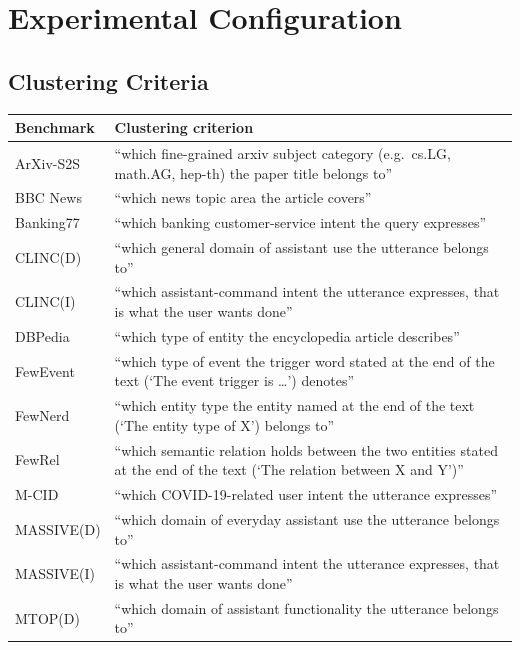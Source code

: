 \documentclass[11pt,a4paper,oneside]{report}
\begin{document}
\FloatBarrier

\clearpage
\chapter{Experimental Configuration}\label{app:config}

\section{Clustering Criteria}\label{app:criteria}

\begin{table}[htbp]
\centering
\small
\begin{tabularx}{\textwidth}{@{}lX@{}}
\toprule
Benchmark & Clustering criterion \\
\midrule
ArXiv-S2S     & ``which fine-grained arxiv subject category (e.g.\ cs.LG, math.AG, hep-th) the paper title belongs to'' \\
BBC News      & ``which news topic area the article covers'' \\
Banking77     & ``which banking customer-service intent the query expresses'' \\
CLINC(D)      & ``which general domain of assistant use the utterance belongs to'' \\
CLINC(I)      & ``which assistant-command intent the utterance expresses, that is what the user wants done'' \\
DBPedia       & ``which type of entity the encyclopedia article describes'' \\
FewEvent      & ``which type of event the trigger word stated at the end of the text (`The event trigger is \ldots') denotes'' \\
FewNerd       & ``which entity type the entity named at the end of the text (`The entity type of X') belongs to'' \\
FewRel        & ``which semantic relation holds between the two entities stated at the end of the text (`The relation between X and Y')'' \\
M-CID         & ``which COVID-19-related user intent the utterance expresses'' \\
MASSIVE(D)    & ``which domain of everyday assistant use the utterance belongs to'' \\
MASSIVE(I)    & ``which assistant-command intent the utterance expresses, that is what the user wants done'' \\
MTOP(D)       & ``which domain of assistant functionality the utterance belongs to'' \\

\end{tabularx}
\end{table}
\end{document}
